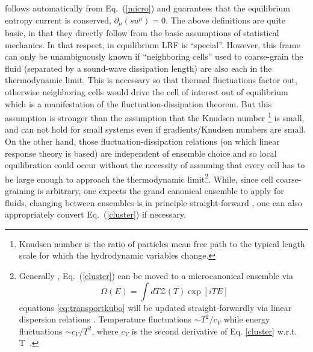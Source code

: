 \documentclass[12pt,onecolumn,showpacs,amssymb,aps,nofootinbib,floatfix]{revtex4-2}
\renewcommand{\eqref}[1]{Eq.~(\ref{#1})}
\begin{document}
	follows automatically from \eqref{micro} and guarantees that the equilibrium entropy current is conserved, $\partial_\mu \left( s u^\mu\right)=0$. 
	The above definitions are quite basic, in that they directly follow from the basic assumptions of statistical mechanics.
	In that respect, in equilibrium LRF is ``special''.
	However, 
	this frame can only be unambiguously known if ``neighboring cells'' used to coarse-grain the fluid (separated by a sound-wave dissipation length) are also each in the thermodynamic limit. This is necessary so that thermal fluctuations factor out, otherwise neighboring cells would drive the cell of interest out of equilibrium which is a manifestation of the fluctuation-dissipation theorem. But this assumption is stronger than the assumption that the Knudsen number \footnote{Knudsen number is the ratio of particles mean free path to the typical length scale for which the hydrodynamic variables change.} is small, and can not hold for small systems even if gradients/Knudsen numbers are small. On the other hand, those fluctuation-dissipation relations (on which linear response theory is based) are independent of ensemble choice \cite{ensemble1,ensemble2,ensemble3} and so local equilibration could occur without the necessity of assuming that every cell has to be large enough to approach the thermodynamic limit\footnote{Generally \cite{ensemble1}, \eqref{cluster} can be moved to a microcanonical ensemble via \[\ \Omega(E)=\int dT \mathcal{Z} (T) \exp\left[iTE \right]  \]
		equations \ref{eq:transportkubo} will be updated straight-forwardly via linear dispersion relations \cite{ensemble3}.  Temperature fluctuations $\sim T^2/c_V$ while energy fluctuations $\sim c_V/T^2$, where $c_V$ is the second derivative of Eq. \ref{cluster} w.r.t. T~\cite{huang}.}.
	While, since cell coarse-graining is arbitrary, one expects the grand canonical ensemble to apply for fluids, changing between ensembles is in principle straight-forward \cite{ensemble1,ensemble2}, one can also appropriately convert \eqref{cluster} if necessary.
\end{document}
